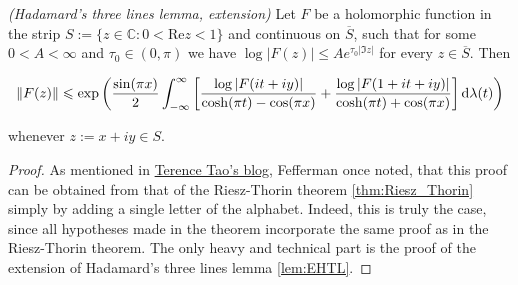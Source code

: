 \begin{mdframed}
	\begin{lemma}\emph{(Hadamard's three lines lemma, extension)}
		Let $F$ be a holomorphic function in the strip $S := \{z \in \mathbb{C}: 0 < \mathrm{Re}z < 1\}$ and continuous on $\overline{S}$, such that for some $0 < A < \infty$ and $\tau_0 \in (0,\pi)$ we have $\log \vert F(z)\vert \leqslant A e^{\tau_0 \vert \Im z \vert}$ for every $z \in \overline{S}$. Then

			\begin{equation*}
				\left\| F(z) \right\| \leqslant \exp\left( \frac{\sin(\pi x)}{2} \int_{-\infty}^\infty \left[ \frac{\log \vert F(it + iy)\vert}{\cosh(\pi t) - \cos(\pi x)} + \frac{\log \vert F(1 + it + iy)\vert}{\cosh(\pi t) + \cos(\pi x)} \right] \mathop{}\!\mathrm{d}\lambda(t)\right)
			\end{equation*}

			whenever $z := x + iy \in S$.
			\label{lem:EHTL}
	\end{lemma}
\end{mdframed}

\begin{proof}
	As mentioned in \href{https://terrytao.wordpress.com/2011/05/03/steins-interpolation-theorem/}{Terence Tao's blog}, Fefferman once noted, that this proof can be obtained from that of the Riesz-Thorin theorem \ref{thm:Riesz_Thorin} simply by adding a single letter of the alphabet. Indeed, this is truly the case, since all hypotheses made in the theorem incorporate the same proof as in the Riesz-Thorin theorem. The only heavy and technical part is the proof of the extension of Hadamard's three lines lemma \ref{lem:EHTL}.
\end{proof}

